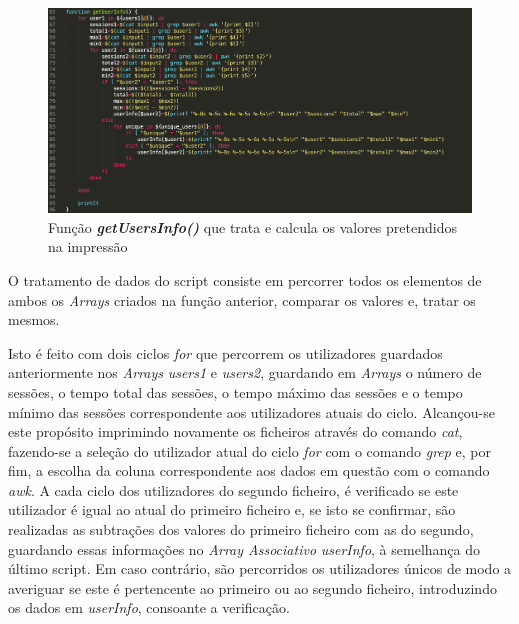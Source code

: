 \documentclass[10pt,portuguese]{article}
\begin{document}
\begin{figure}[!h]
    \centering
    \includegraphics[width=\textwidth]{comparestats/getusersinfo_c.png}
    \caption{Função \textbf{\textit{getUsersInfo()}} que trata e calcula os valores pretendidos na impressão}
\end{figure}
\par O tratamento de dados do script consiste em percorrer todos os elementos de ambos os \textit{Arrays} criados na função anterior, comparar os valores e, tratar os mesmos. 
\par Isto é feito com dois ciclos \textit{for} que percorrem os utilizadores guardados anteriormente nos \textit{Arrays} \textit{users1} e \textit{users2}, guardando em \textit{Arrays} o número de sessões, o tempo total das sessões, o tempo máximo das sessões e o tempo mínimo das sessões correspondente aos utilizadores atuais do ciclo. Alcançou-se este propósito imprimindo novamente os ficheiros através do comando \textit{cat}, fazendo-se a seleção do utilizador atual do ciclo \textit{for} com o comando \textit{grep} e, por fim, a escolha da coluna correspondente aos dados em questão com o comando \textit{awk}. 
\Par A cada ciclo dos utilizadores do segundo ficheiro, é verificado se este utilizador é igual ao atual do primeiro ficheiro e, se isto se confirmar, são realizadas as subtrações dos valores do primeiro ficheiro com as do segundo, guardando essas informações no \textit{Array Associativo} \textit{userInfo}, à semelhança do último script. Em caso contrário, são percorridos os utilizadores únicos de modo a averiguar se este é pertencente ao primeiro ou ao segundo ficheiro, introduzindo os dados em \textit{userInfo}, consoante a verificação.

\clearpage
\end{document}
